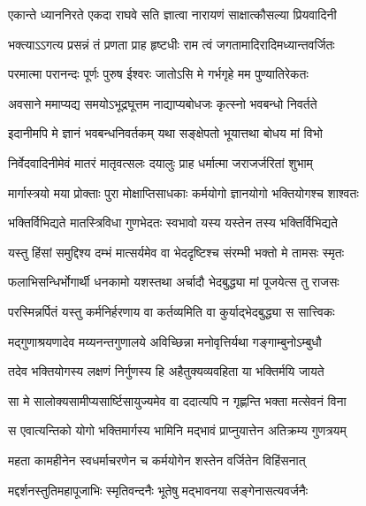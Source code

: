 

\addtocounter{shlokacount}{52}

\twolineshloka
{एकान्ते ध्याननिरते एकदा राघवे सति}
{ज्ञात्वा नारायणं साक्षात्कौसल्या प्रियवादिनी} %

\twolineshloka
{भक्त्याऽऽगत्य प्रसन्नं तं प्रणता प्राह हृष्टधीः}
{राम त्वं जगतामादिरादिमध्यान्तवर्जितः} %

\twolineshloka
{परमात्मा परानन्दः पूर्णः पुरुष ईश्वरः}
{जातोऽसि मे गर्भगृहे मम पुण्यातिरेकतः} %

\twolineshloka
{अवसाने ममाप्यद्य समयोऽभूद्रघूत्तम}
{नाद्याप्यबोधजः कृत्स्नो भवबन्धो निवर्तते} %

\twolineshloka
{इदानीमपि मे ज्ञानं भवबन्धनिवर्तकम्}
{यथा सङ्क्षेपतो भूयात्तथा बोधय मां विभो} %

\twolineshloka
{निर्वेदवादिनीमेवं मातरं मातृवत्सलः}
{दयालुः प्राह धर्मात्मा जराजर्जरितां शुभाम्} %

\twolineshloka
{मार्गास्त्रयो मया प्रोक्ताः पुरा मोक्षाप्तिसाधकाः}
{कर्मयोगो ज्ञानयोगो भक्तियोगश्च शाश्वतः} %

\twolineshloka
{भक्तिर्विभिद्यते मातस्त्रिविधा गुणभेदतः}
{स्वभावो यस्य यस्तेन तस्य भक्तिर्विभिद्यते} %

\twolineshloka
{यस्तु हिंसां समुद्दिश्य दम्भं मात्सर्यमेव वा}
{भेददृष्टिश्च संरम्भी भक्तो मे तामसः स्मृतः} %

\twolineshloka
{फलाभिसन्धिर्भोगार्थी धनकामो यशस्तथा}
{अर्चादौ भेदबुद्ध्या मां पूजयेत्स तु राजसः} %

\twolineshloka
{परस्मिन्नर्पितं यस्तु कर्मनिर्हरणाय वा}
{कर्तव्यमिति वा कुर्याद्भेदबुद्ध्या स सात्त्विकः} %

\twolineshloka
{मद्गुणाश्रयणादेव मय्यनन्तगुणालये}
{अविच्छिन्ना मनोवृत्तिर्यथा गङ्गाम्बुनोऽम्बुधौ} %

\twolineshloka
{तदेव भक्तियोगस्य लक्षणं निर्गुणस्य हि}
{अहैतुक्यव्यवहिता या भक्तिर्मयि जायते} %

\twolineshloka
{सा मे सालोक्यसामीप्यसार्ष्टिसायुज्यमेव वा}
{ददात्यपि न गृह्णन्ति भक्ता मत्सेवनं विना} %

\twolineshloka
{स एवात्यन्तिको योगो भक्तिमार्गस्य भामिनि}
{मद्भावं प्राप्नुयात्तेन अतिक्रम्य गुणत्रयम्} %

\twolineshloka
{महता कामहीनेन स्वधर्माचरणेन च}
{कर्मयोगेन शस्तेन वर्जितेन विहिंसनात्} %

\twolineshloka
{मद्दर्शनस्तुतिमहापूजाभिः स्मृतिवन्दनैः}
{भूतेषु मद्भावनया सङ्गेनासत्यवर्जनैः} %

